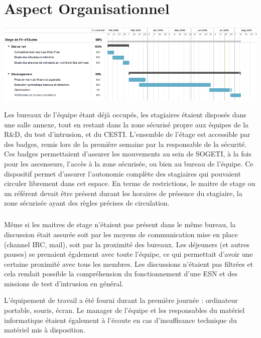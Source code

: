 \section*{Aspect Organisationnel}
\begin{center}
\includegraphics[scale=0.5]{gant.png}\newline
\end{center}

Les bureaux de l'équipe étant déjà occupés, les stagiaires étaient disposés dans une salle annexe, tout en restant dans la zone sécurisé propre aux équipes de
la R\&D, du test d'intrusion, et du CESTI. L'ensemble de l'étage est accessible par des badges, remis lors de la première semaine par la responsable de la
sécurité. Ces badges permettaient d'assurer les mouvements au sein de SOGETI, à la fois pour les ascenseurs, l'accès à la zone sécurisée, ou bien au bureau
de l'équipe. Ce dispositif permet d'assurer l'autonomie complète des stagiaires qui pouvaient circuler librement dans cet espace. En terme de restrictions,
le maitre de stage ou un référent devait être présent durant les horaires de présence du stagiaire, la zone sécurisée ayant des règles précises de circulation.

\subparagraph{}
Même si les maitres de stage n'étaient pas présent dans le même bureau, la discussion était assurée soit par les moyens de communication mise en
place (channel IRC, mail), soit par la proximité des bureaux. Les déjeuners (et autres pauses) se prenaient également avec toute l'équipe, ce qui permettait
d'avoir une certaine proximité avec tous les membres. Les discussions n'étaient pas filtrées et cela rendait possible la compréhension du fonctionnement d'une
ESN et des missions de test d'intrusion en général.

L'équipement de travail a été fourni durant la première journée : ordinateur portable, souris, écran. Le manager de l'équipe et les responsables du matériel
informatique étaient également à l'écoute en cas d'insuffisance technique du matériel mis à disposition.


